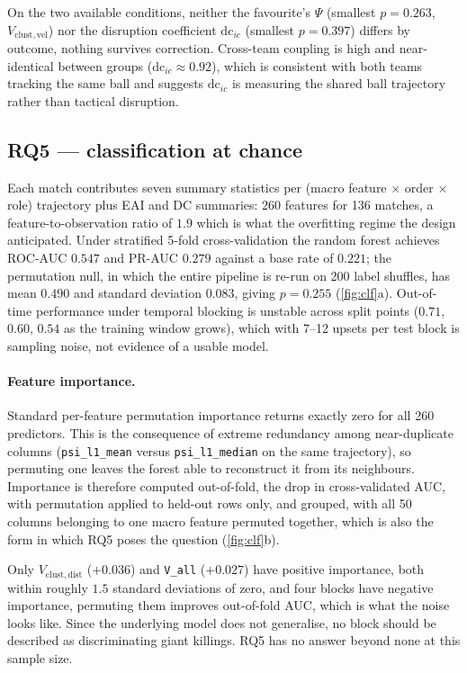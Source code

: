 \documentclass[11pt,a4paper]{article}
\newcommand{\code}[1]{\texttt{\small #1}}
\newcommand{\Vcd}{V_{\mathrm{clust,dist}}}
\newcommand{\Vcv}{V_{\mathrm{clust,vel}}}
\begin{document}
On the two available conditions, neither the favourite's $\Psi$ (smallest $p=0.263$,
$\Vcv$) nor the disruption coefficient $\mathrm{dc}_{ic}$ (smallest $p=0.397$) differs by
outcome, nothing survives correction. Cross-team coupling is high and near-identical
between groups ($\mathrm{dc}_{ic}\approx0.92$), which is consistent with both teams
tracking the same ball and suggests $\mathrm{dc}_{ic}$ is measuring the shared ball
trajectory rather than tactical disruption.

\subsection{RQ5 --- classification at chance}

Each match contributes seven summary statistics per (macro feature
$\times$ order $\times$ role) trajectory plus EAI and DC summaries: 260 features for 136
matches, a feature-to-observation ratio of $1.9$ which is what the overfitting regime the
design anticipated. Under stratified 5-fold cross-validation the random forest achieves
ROC-AUC $0.547$ and PR-AUC $0.279$ against a base rate of $0.221$; the permutation null,
in which the entire pipeline is re-run on 200 label shuffles, has mean $0.490$ and standard
deviation $0.083$, giving $p=0.255$ (\cref{fig:clf}a). Out-of-time performance under
temporal blocking is unstable across split points ($0.71$, $0.60$, $0.54$ as the training
window grows), which with 7--12 upsets per test block is sampling noise, not evidence of a
usable model.

\paragraph{Feature importance.} Standard per-feature permutation importance
returns exactly zero for all 260 predictors. This is the
consequence of extreme redundancy among near-duplicate columns
(\code{psi\_l1\_mean} versus \code{psi\_l1\_median} on the same trajectory), so permuting
one leaves the forest able to reconstruct it from its neighbours. Importance is therefore
computed out-of-fold, the drop in cross-validated AUC, with permutation applied to
held-out rows only, and grouped, with all 50 columns belonging to one macro feature
permuted together, which is also the form in which RQ5 poses the question
(\cref{fig:clf}b).

Only $\Vcd$ ($+0.036$) and \code{V\_all} ($+0.027$) have positive importance, both within
roughly $1.5$ standard deviations of zero, and four blocks have negative importance, permuting them improves out-of-fold AUC, which is what the noise looks like. Since the
underlying model does not generalise, no block should be described as discriminating giant
killings. RQ5 has no answer beyond none at this sample size. %
\end{document}
